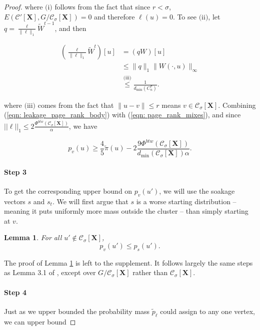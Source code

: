 \documentclass{article}
\newcommand{\1}{\mathbf{1}}
\newcommand{\Xbf}{\mathbf{X}}
\newcommand{\Cset}{\mathcal{C}}
\newcommand{\Csig}{\Cset_{\sigma}}
\theoremstyle{aldenthm}
\newtheorem{lemma}{Lemma}
\begin{document}
\begin{proof}
	where $\text{(i)}$ follows from the fact that since $r < \sigma$, $E(\Cset'[\Xbf], G / \Csig[\Xbf]) = 0$ and therefore $\ell(u) = 0$. To see $\text{(ii)}$, let $q = \frac{\ell}{\|\ell\|_1}  \widetilde{W}^{t-1}$, and then 
	
	\begin{align*}
	\left(\frac{\ell}{\|\ell\|_1}  \widetilde{W}^t \right)[u] & = \left(q W \right)[u] \\
	& \leq \|q\|_1 \|W(\cdot, u)\|_{\infty} \\
	& \overset{\text{(iii)}}{\leq} \frac{1}{d_{\min}(C^{\sigma}_n)}.
	\end{align*}
	
	where $\text{(iii)}$ comes from the fact that $\|u-v\| \leq r$ means $v \in \Csig[\Xbf]$.
	Combining (\ref{eqn: leakage_page_rank_body}) with (\ref{eqn: page_rank_mixes}), and since $||\ell||_1 \leq 2 \frac{\Phi^{btw}(\Csig[\Xbf])}{\alpha}$, we have
	
	\begin{equation*}
	p_v(u) \geq \frac{4}{5} \widetilde{\pi}(u) - 2\frac{9 \Phi^{btw}(\Csig[\Xbf])}{d_{\min}(\Csig[\Xbf]) \alpha}.
	\end{equation*}
	
	\paragraph{Step 3}
	To get the corresponding upper bound on $p_v(u')$, we will use the soakage vectors $s$ and $s_t$. We will first argue that $s$ is a worse starting distribution -- meaning it puts uniformly more mass outside the cluster -- than simply starting at $v$.
	
	\begin{lemma} \label{lem: gained mass is soaked_body}
		For all $u' \notin \Csig[\Xbf]$,
		\begin{equation}
		p_v(u') \leq p_{s}(u').
		\end{equation}
	\end{lemma}
	
	The proof of Lemma \ref{lem: gained mass is soaked_body} is left to the supplement. It follows largely the same steps as Lemma 3.1 of \cite{zhu2013}, except over $G / \Csig[\Xbf]$ rather than $\Csig[\Xbf]$. 
	
	\paragraph{Step 4}
	
	Just as we upper bounded the probability mass $\widetilde{p}_{\ell}$ could assign to any one vertex, we can upper bound 
	

\end{proof}
\end{document}
